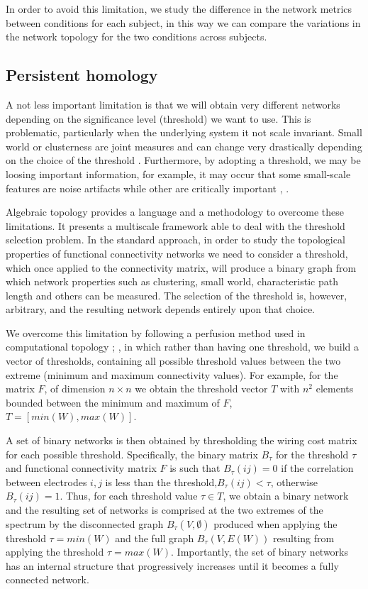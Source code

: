 \documentclass[11pt, onecolumn]{article}
\begin{document}
In order to avoid this limitation, we study the difference in the network metrics between conditions for each subject, in this way we can compare the variations in the network topology for the two conditions across subjects.


\subsection{Persistent homology}
A not less important limitation is that we will obtain very different networks depending on the significance level (threshold) we want to use. This is problematic, particularly when the underlying system it not scale invariant. Small world or clusterness are joint measures and can change very drastically depending on the choice of the threshold \cite{toppi2012statistical}. Furthermore, by adopting a threshold, we may be loosing important information, for example, it may occur that some small-scale features are noise artifacts while other are critically important \cite{fallani2014graph}, \cite{papo2014complex}.

Algebraic topology \cite{munkres1984elements} provides a language and a methodology to overcome these limitations. It presents a multiscale framework able to deal with the threshold selection problem.
In the standard approach, in order to study the  topological properties of functional connectivity networks we need to consider a threshold, which once applied to the connectivity matrix, will produce a binary graph from which network properties such as clustering, small world, characteristic path length and others can be measured. 
The selection of the threshold is, however, arbitrary, and the resulting network depends entirely upon that choice.

We overcome this limitation by following a perfusion method used in computational topology \citep{dabaghian2014reconceiving}; \citep{dotko2016topological}, in which rather than having one threshold, we build a vector of thresholds, containing all possible threshold values between the two extreme (minimum and maximum connectivity values). For example, for the matrix $F$, of dimension $n \times n$ we obtain the threshold vector $T$ with $n^2$ elements bounded between the minimum and maximum of $F$, $T = [min(W), max(W)]$.

A set of binary networks is then obtained by thresholding the wiring cost matrix for each possible threshold. Specifically, the binary matrix $B_{\tau}$ for the threshold $\tau$ and functional connectivity matrix $F$ is such that $B_{\tau}(ij) =0$ if the correlation between electrodes $i,j$ is less than the threshold,$B_{\tau}(ij)<\tau$, otherwise $B_{\tau}(ij)=1$. 
Thus, for each threshold value $\tau \in T$, we obtain a binary network and the resulting set of networks is comprised at the two extremes of the spectrum by the disconnected graph $B_{\tau}(V,\emptyset)$ produced when applying the threshold $\tau = min(W)$ and the full graph $B_{\tau}(V,E(W))$ resulting from applying the threshold $\tau = max(W)$. 
Importantly, the set of binary networks has an internal structure that progressively increases until it becomes a fully connected network. 
\end{document}
